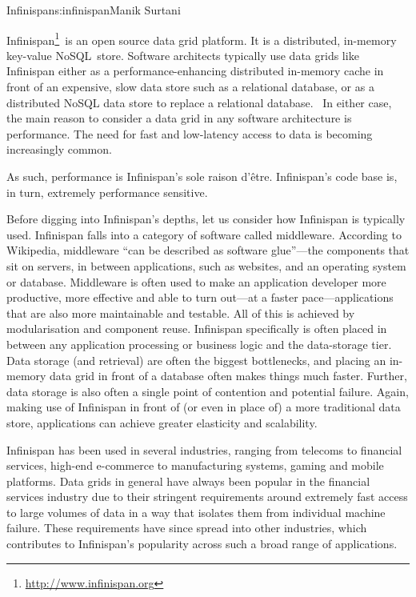 \begin{aosachapter}{Infinispan}{s:infinispan}{Manik Surtani}


Infinispan\footnote{\url{http://www.infinispan.org}}~is an open source
data grid platform. It is a distributed, in-memory key-value
NoSQL~store. Software architects typically use data grids like
Infinispan either as a performance-enhancing distributed in-memory cache
in front of an expensive, slow data store such as a relational database,
or as a distributed NoSQL data store to replace a relational database.
~In either case, the main reason to consider a data grid in any software
architecture is performance. The need for fast and low-latency access
to data is becoming increasingly common.

As such, performance is Infinispan's sole raison d'être. Infinispan's
code base is, in turn, extremely performance sensitive.


Before digging into Infinispan's depths, let us consider how Infinispan
is typically used. Infinispan falls into a category of software called
middleware. According to Wikipedia, middleware ``can be described as
software glue''---the components that sit on servers, in between
applications, such as websites, and an operating system or database.
Middleware is often used to make an application developer more
productive, more effective and able to turn out---at a faster
pace---applications that are also more maintainable and testable. All of
this is achieved by modularisation and component reuse. Infinispan
specifically is often placed in between any application processing or
business logic and the data-storage tier. Data storage (and retrieval)
are often the biggest bottlenecks, and placing an in-memory data grid in
front of a database often makes things much faster. Further, data
storage is also often a single point of contention and potential
failure. Again, making use of Infinispan in front of (or even in place
of) a more traditional data store, applications can achieve greater
elasticity and scalability.


Infinispan has been used in several industries, ranging from telecoms to
financial services, high-end e-commerce to manufacturing systems, gaming
and mobile platforms. Data grids in general have always been popular in
the financial services industry due to their stringent requirements
around extremely fast access to large volumes of data in a way that
isolates them from individual machine failure. These requirements have
since spread into other industries, which contributes to Infinispan's
popularity across such a broad range of applications.


\end{aosachapter}
